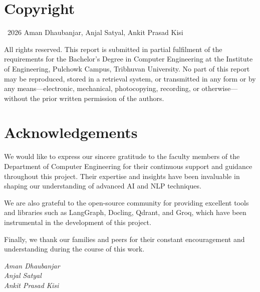 \documentclass[12pt,a4paper]{report}
\begin{document}
\newpage

\chapter*{Copyright}

\vspace*{3cm}
\begin{center}
    \textcopyright\ 2026 Aman Dhaubanjar, Anjal Satyal, Ankit Prasad Kisi
\end{center}

\vspace{1cm}
\noindent All rights reserved. This report is submitted in partial fulfilment of
the requirements for the Bachelor's Degree in Computer Engineering at the Institute
of Engineering, Pulchowk Campus, Tribhuvan University. No part of this report may
be reproduced, stored in a retrieval system, or transmitted in any form or by any
means—electronic, mechanical, photocopying, recording, or otherwise—without the
prior written permission of the authors.

\newpage

\chapter*{Acknowledgements}

We would like to express our sincere gratitude to the faculty members of the
Department of Computer Engineering for their continuous support and guidance
throughout this project. Their expertise and insights have been invaluable in
shaping our understanding of advanced AI and NLP techniques.

We are also grateful to the open-source community for providing excellent tools
and libraries such as LangGraph, Docling, Qdrant, and Groq, which have been
instrumental in the development of this project.

Finally, we thank our families and peers for their constant encouragement and
understanding during the course of this work.

\vspace{1cm}
\begin{flushright}
\textit{Aman Dhaubanjar}\\
\textit{Anjal Satyal}\\
\textit{Ankit Prasad Kisi}
\end{flushright}
\end{document}
